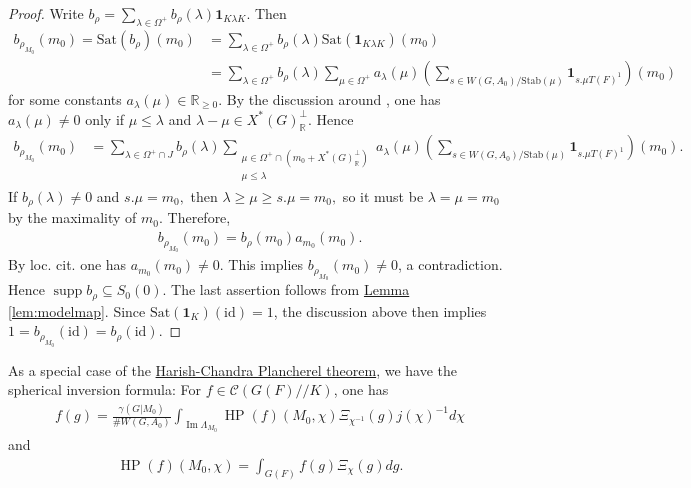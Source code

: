 \documentclass[10pt]{amsart}
\theoremstyle{definition}
\numberwithin{equation}{section}
\DeclareMathOperator{\supp}{\mathrm{supp}}
\numberwithin{equation}{subsection}
\newcommand{\RR}{\mathbb{R}}
\renewcommand{\Im}{\mathop{\mathrm{Im}}}
\newcommand{\HP}{\mathop{\mathrm{HP}}\nolimits}
\begin{document}
\begin{proof}
Write $b_\rho = \sum_{\lambda\in \Omega^+} b_\rho(\lambda)\mathbf{1}_{K\lambda K}.$ Then
\begin{align*}
    b_{\rho_{M_0}}(m_0) = \mathrm{Sat}(b_\rho)(m_0) &= \sum_{\lambda\in \Omega^+} b_\rho(\lambda) \mathrm{Sat}(\mathbf{1}_{K\lambda K})(m_0) \\
    &= \sum_{\lambda\in \Omega^+} b_\rho(\lambda)\sum_{\mu\in \Omega^+} a_{\lambda}(\mu) \left(\sum_{s\in W(G,A_0)/\mathrm{Stab}(\mu)}\mathbf{1}_{s.\mu T(F)^1}\right)(m_0)
\end{align*}
for some constants $a_\lambda(\mu)\in \RR_{\ge 0}.$ By the discussion around \cite[(6.7)]{Satake}, one has $a_{\lambda}(\mu)\neq 0$ only if $\mu\leq\lambda$ and $\lambda-\mu\in X^*(G)^\perp_\RR$. Hence 
\begin{align*}
    b_{\rho_{M_0}}(m_0) &= \sum_{\lambda\in \Omega^+\cap J}b_\rho(\lambda)\sum_{\substack{\mu\in \Omega^+\cap (m_0+X^\ast(G)_\RR^\perp)\\ \mu\le \lambda}} a_{\lambda}(\mu) \left(\sum_{s\in W(G,A_0)/\mathrm{Stab}(\mu)}\mathbf{1}_{s.\mu T(F)^1}\right)(m_0).
\end{align*}
If $b_\rho(\lambda)\neq 0$ and $s.\mu=m_0,$ then $\lambda\ge \mu\ge s.\mu=m_0,$ so it must be $\lambda=\mu=m_0$ by the maximality of $m_0$. Therefore,
\begin{align*}
    b_{\rho_{M_0}}(m_0) = b_\rho(m_0)a_{m_0}(m_0).
\end{align*}
By loc. cit. one has $a_{m_0}(m_0)\neq 0$. This implies $b_{\rho_{M_0}}(m_0)\neq 0$, a contradiction. Hence $\supp b_\rho\subseteq S_0(0)$. The last assertion follows from \hyperref[lem:modelmap]{Lemma \ref{lem:modelmap}}. Since $\mathrm{Sat}(\mathbf{1}_{K})(\mathrm{id})=1$, the discussion above then implies $1 = b_{\rho_{M_0}}(\mathrm{id}) = b_\rho(\mathrm{id})$. 
\end{proof}


As a special case of the \hyperref[HCPlan]{Harish-Chandra Plancherel theorem}, we have the spherical inversion formula: For $f\in\mathcal{C}(G(F)/\!/K)$, one has
\begin{align*}
    f(g) = \frac{\gamma(G|M_0)}{\#W(G,A_0)}\int_{\Im\Lambda_{M_0}} \HP(f)(M_0,\chi)\Xi_{\chi^{-1}}(g) j(\chi)^{-1}d\chi
\end{align*}
and
\begin{align*}
    \HP(f)(M_0,\chi) = \int_{G(F)} f(g)\Xi_\chi(g)dg.
\end{align*}
\end{document}
